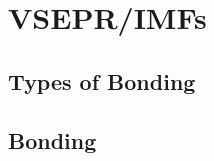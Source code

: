 \documentclass[../hchem.tex]{subfiles}
\begin{document}
\chapter{VSEPR/IMFs}
\section{Types of Bonding}
\section{Bonding}
\end{document}

